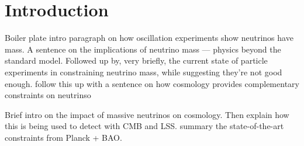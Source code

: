 \section{Introduction}
Boiler plate intro paragraph on how oscillation experiments show neutrinos have mass. 
A sentence on the implications of neutrino mass --- physics beyond the standard model. 
Followed up by, very briefly, the current state of particle experiments in constraining
neutrino mass, while suggesting they're not good enough. 
follow this up with a sentence on how cosmology provides complementary constraints on 
neutrinso

Brief intro on the impact of massive neutrinos on cosmology.
Then explain how this is being used to detect with CMB and LSS. 
summary the state-of-the-art constraints from Planck + BAO.


